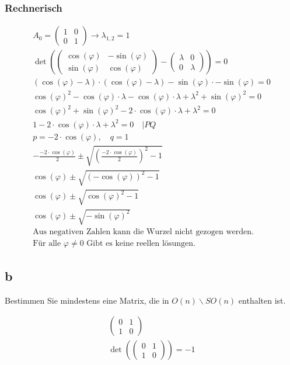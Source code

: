 \subsubsection*{Rechnerisch}

\begin{align*}
    A_0 = \begin{pmatrix}
        1 & 0 \\
        0 & 1
    \end{pmatrix} \rightarrow \lambda_{1,2} = 1 \\
    \det\left(\begin{pmatrix}
        \cos(\varphi) & -\sin(\varphi) \\
        \sin(\varphi) & \cos(\varphi)
    \end{pmatrix} - \begin{pmatrix}
        \lambda & 0 \\
        0 & \lambda
    \end{pmatrix}\right) = 0 \\
    (\cos(\varphi) - \lambda) \cdot (\cos(\varphi) - \lambda) - \sin(\varphi) \cdot -\sin(\varphi) = 0 \\
    {\cos(\varphi)}^2 - \cos(\varphi) \cdot \lambda - \cos(\varphi) \cdot \lambda  + \lambda^2 + {\sin(\varphi)}^2 = 0\\
    {\cos(\varphi)}^2 + {\sin(\varphi)}^2 - 2 \cdot \cos(\varphi) \cdot \lambda + \lambda^2 = 0 \\
    1 - 2 \cdot \cos(\varphi) \cdot \lambda + \lambda^2 = 0 \quad | PQ\\
    p = - 2 \cdot \cos(\varphi), \quad q = 1 \\
    -\frac{- 2 \cdot \cos(\varphi)}{2} \pm \sqrt{\left(\frac{- 2 \cdot \cos(\varphi)}{2}\right)^2 - 1} \\
    \cos(\varphi)\pm \sqrt{(-\cos(\varphi))^2 - 1} \\
    \cos(\varphi)\pm \sqrt{\cos(\varphi)^2 - 1} \\
    \cos(\varphi)\pm \sqrt{-\sin(\varphi)^2} \\
    \text{Aus negativen Zahlen kann die Wurzel nicht gezogen werden.} \\
    \text{Für alle } \varphi \neq 0 \text{ Gibt es keine reellen lösungen.}
\end{align*}

\subsection{b}

Bestimmen Sie mindestens eine Matrix, die in $O(n) \backslash SO(n)$ enthalten ist.

\begin{align*}
    \begin{pmatrix}
        0 & 1 \\
        1 & 0
    \end{pmatrix} \\
    \det\left(    \begin{pmatrix}
        0 & 1 \\
        1 & 0
    \end{pmatrix}\right) = -1 \\
\end{align*}